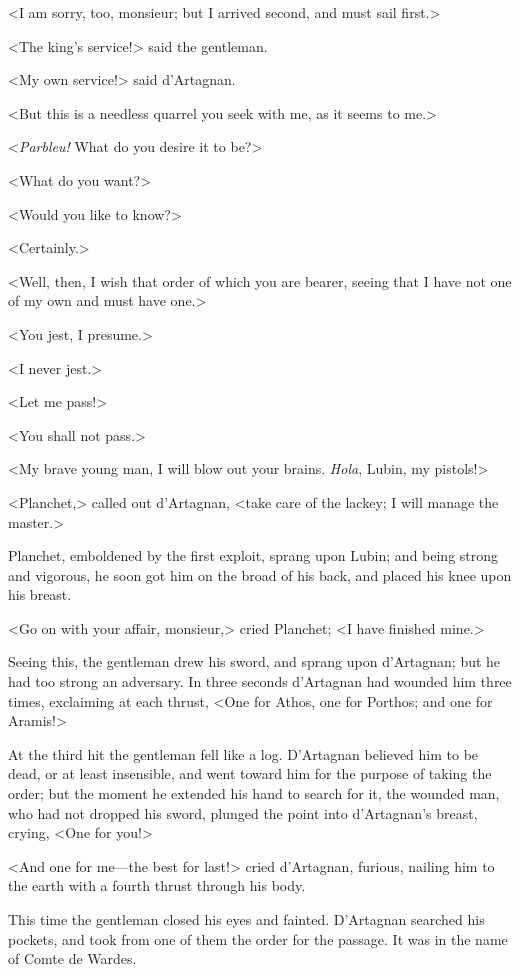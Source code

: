 <I am sorry, too, monsieur; but I arrived second, and must sail first.> 

<The king's service!> said the gentleman. 

<My own service!> said d'Artagnan. 

<But this is a needless quarrel you seek with me, as it seems to me.> 

<\textit{Parbleu!} What do you desire it to be?> 

<What do you want?> 

<Would you like to know?> 

<Certainly.> 

<Well, then, I wish that order of which you are bearer, seeing that I have not one of my own and must have one.> 

<You jest, I presume.> 

<I never jest.> 

<Let me pass!> 

<You shall not pass.> 

<My brave young man, I will blow out your brains. \textit{Hola}, Lubin, my pistols!> 

<Planchet,> called out d'Artagnan, <take care of the lackey; I will manage the master.> 

Planchet, emboldened by the first exploit, sprang upon Lubin; and being strong and vigorous, he soon got him on the broad of his back, and placed his knee upon his breast. 

<Go on with your affair, monsieur,> cried Planchet; <I have finished mine.> 

Seeing this, the gentleman drew his sword, and sprang upon d'Artagnan; but he had too strong an adversary. In three seconds d'Artagnan had wounded him three times, exclaiming at each thrust, <One for Athos, one for Porthos; and one for Aramis!> 

At the third hit the gentleman fell like a log. D'Artagnan believed him to be dead, or at least insensible, and went toward him for the purpose of taking the order; but the moment he extended his hand to search for it, the wounded man, who had not dropped his sword, plunged the point into d'Artagnan's breast, crying, <One for you!> 

<And one for me---the best for last!> cried d'Artagnan, furious, nailing him to the earth with a fourth thrust through his body. 

This time the gentleman closed his eyes and fainted. D'Artagnan searched his pockets, and took from one of them the order for the passage. It was in the name of Comte de Wardes. 

